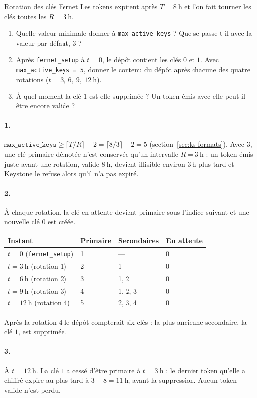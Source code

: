 \begin{exercice}{Rotation des clés Fernet}\label{ex:ks-fernet}
Les tokens expirent après $T=8\ \mathrm{h}$ et l'on fait tourner les clés toutes les $R=3\ \mathrm{h}$.
\begin{enumerate}[label=\arabic*.,nosep]
  \item Quelle valeur minimale donner à \texttt{max\_active\_keys} ? Que se passe-t-il avec la valeur par défaut, 3 ?
  \item Après \texttt{fernet\_setup} à $t=0$, le dépôt contient les clés $0$ et $1$. Avec \texttt{max\_active\_keys = 5}, donner le
        contenu du dépôt après chacune des quatre rotations ($t=3,\ 6,\ 9,\ 12\ \mathrm{h}$).
  \item À quel moment la clé $1$ est-elle supprimée ? Un token émis avec elle peut-il être encore valide ?
\end{enumerate}
\end{exercice}
\begin{correction}
\paragraph{1.} $\texttt{max\_active\_keys}\ge\lceil T/R\rceil+2=\lceil 8/3\rceil+2=5$ (section~\ref{sec:ks-formats}). Avec $3$, une clé
primaire démotée n'est conservée qu'un intervalle $R=3\ \mathrm{h}$ : un token émis juste avant une rotation, valide $8\ \mathrm{h}$,
devient illisible environ $3\ \mathrm{h}$ plus tard et Keystone le refuse alors qu'il n'a pas expiré.

\paragraph{2.} À chaque rotation, la clé en attente devient primaire sous l'indice suivant et une nouvelle clé $0$ est créée.
\begin{center}
\renewcommand{\arraystretch}{1.15}
\begin{tabular}{@{}llll@{}}
\toprule
\textbf{Instant} & \textbf{Primaire} & \textbf{Secondaires} & \textbf{En attente} \\
\midrule
$t=0$ (\texttt{fernet\_setup}) & 1 & --- & 0 \\
$t=3\ \mathrm{h}$ (rotation 1) & 2 & 1 & 0 \\
$t=6\ \mathrm{h}$ (rotation 2) & 3 & 1, 2 & 0 \\
$t=9\ \mathrm{h}$ (rotation 3) & 4 & 1, 2, 3 & 0 \\
$t=12\ \mathrm{h}$ (rotation 4) & 5 & 2, 3, 4 & 0 \\
\bottomrule
\end{tabular}
\end{center}
Après la rotation 4 le dépôt compterait six clés : la plus ancienne secondaire, la clé $1$, est supprimée.

\paragraph{3.} À $t=12\ \mathrm{h}$. La clé $1$ a cessé d'être primaire à $t=3\ \mathrm{h}$ : le dernier token qu'elle a chiffré expire au
plus tard à $3+8=11\ \mathrm{h}$, avant la suppression. Aucun token valide n'est perdu.
\end{correction}

